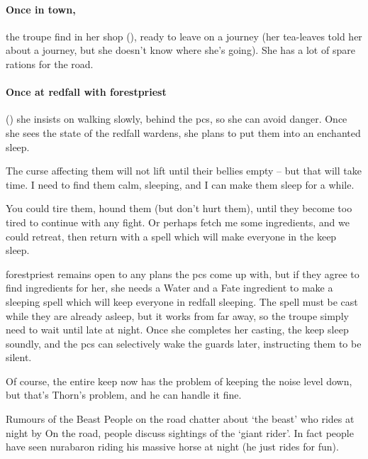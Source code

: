 \paragraph{Once in \gls{town},}
the troupe find  in her shop (), ready to leave on a journey (her tea-leaves told her about a journey, but she doesn't know where she's going).
She has a lot of spare \glspl{ration} for the road.

\paragraph{Once at \gls{redfall} with \gls{forestpriest}}
()
she insists on walking slowly, behind the \glspl{pc}, so she can avoid danger.
Once she sees the state of the \gls{redfall} \glspl{warden}, she plans to put them into an enchanted sleep.

\begin{speechtext}
  The curse affecting them will not lift until their bellies empty -- but that will take time.
  I need to find them calm, sleeping, and I can make them sleep for a while.

  You could tire them, hound them (but don't hurt them), until they become too tired to continue with any fight.
  Or perhaps fetch me some \glspl{ingredient}, and we could retreat, then return with a spell which will make everyone in the keep sleep.
\end{speechtext}

\Gls{forestpriest} remains open to any plans the \glspl{pc} come up with, but if they agree to find \glspl{ingredient} for her, she needs a Water and a Fate \gls{ingredient} to make a sleeping spell which will keep everyone in \gls{redfall} sleeping.
The spell must be cast while they are already asleep, but it works from far away, so the troupe simply need to wait until late at night.
Once she completes her \gls{casting}, the keep sleep soundly, and the \glspl{pc} can selectively wake the guards later, instructing them to be silent.

Of course, the entire keep now has the problem of keeping the noise level down, but that's Thorn's problem, and he can handle it fine.

{Rumours of the Beast}%
{People on the road chatter about `the beast' who rides at night by }%
On the road, people discuss sightings of the `giant rider'.
In fact people have seen \gls{nurabaron} riding his massive horse at night (he just rides for fun).

